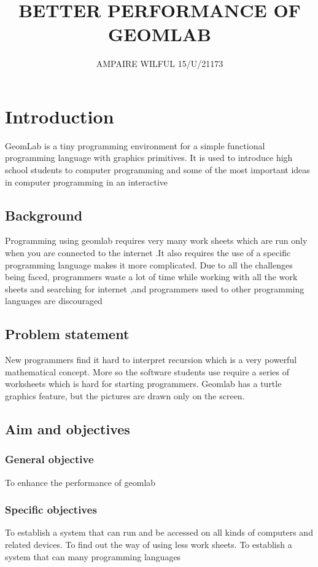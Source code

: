 \documentclass {article}
\begin{document}
\title {BETTER PERFORMANCE OF GEOMLAB}
\author {AMPAIRE WILFUL 15/U/21173}
\maketitle
\section {Introduction}
GeomLab is a tiny programming environment for a simple functional programming language with graphics primitives.
 It is used to introduce high school students to computer programming and some of the most important ideas in computer programming in an interactive
\subsection {Background }
Programming using geomlab requires very many work sheets which are run only when you are connected to the internet .It also requires the use of a specific programming language makes it more complicated. Due to all the challenges being faced, programmers waste a lot of time while working with all the work sheets and searching for internet ,and programmers used to other programming languages are discouraged        


\subsection {Problem statement}
New programmers find it hard to interpret recursion which is a very powerful mathematical concept. More so the software students use require a series of worksheets which is hard for starting programmers. Geomlab has a turtle graphics feature, but the pictures are drawn only on the screen.
\subsection{ Aim and objectives}
\subsubsection{ General objective}
To enhance the performance of geomlab
 \subsubsection {Specific objectives}
To establish a system that can run and be accessed on all kinds of computers and related devices.
\newline To find out the way of using less work sheets.
\newline To establish a system that can many programming languages
\end{document}

